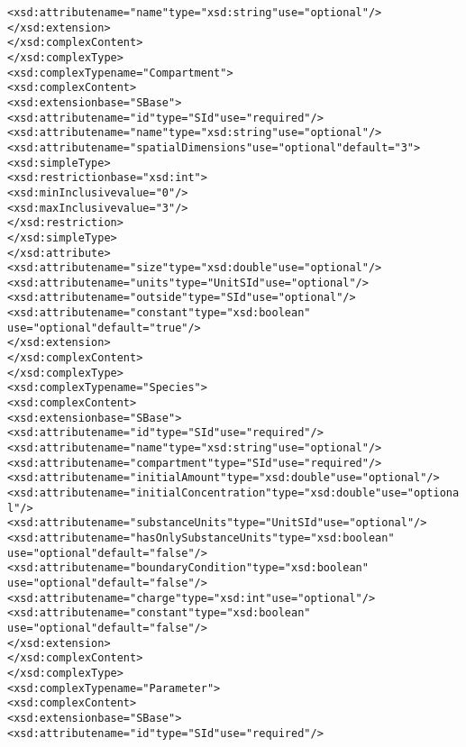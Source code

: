 \begin{alltt}
                <xsd:attribute name="name" type="xsd:string" use="optional"/>
            </xsd:extension>
        </xsd:complexContent>
    </xsd:complexType>
    <xsd:complexType name="Compartment">
        <xsd:complexContent>
            <xsd:extension base="SBase">
                <xsd:attribute name="id" type="SId" use="required"/>
                <xsd:attribute name="name" type="xsd:string" use="optional"/>
                <xsd:attribute name="spatialDimensions" use="optional" default="3">
                    <xsd:simpleType>
                        <xsd:restriction base="xsd:int">
                            <xsd:minInclusive value="0"/>
                            <xsd:maxInclusive value="3"/>
                        </xsd:restriction>
                    </xsd:simpleType>
                </xsd:attribute>
                <xsd:attribute name="size" type="xsd:double" use="optional"/>
                <xsd:attribute name="units" type="UnitSId" use="optional"/>
                <xsd:attribute name="outside" type="SId" use="optional"/>
                <xsd:attribute name="constant" type="xsd:boolean" 
                               use="optional" default="true"/>
            </xsd:extension>
        </xsd:complexContent>
    </xsd:complexType>
    <xsd:complexType name="Species">
        <xsd:complexContent>
            <xsd:extension base="SBase">
                <xsd:attribute name="id" type="SId" use="required"/>
                <xsd:attribute name="name" type="xsd:string" use="optional"/>
                <xsd:attribute name="compartment" type="SId" use="required"/>
                <xsd:attribute name="initialAmount" type="xsd:double" use="optional"/>
                <xsd:attribute name="initialConcentration" type="xsd:double" use="optional"/>
                <xsd:attribute name="substanceUnits" type="UnitSId" use="optional"/>
                <xsd:attribute name="hasOnlySubstanceUnits" type="xsd:boolean" 
                               use="optional" default="false"/>
                <xsd:attribute name="boundaryCondition" type="xsd:boolean" 
                               use="optional" default="false"/>
                <xsd:attribute name="charge" type="xsd:int" use="optional"/>
                <xsd:attribute name="constant" type="xsd:boolean" 
                               use="optional" default="false"/>
            </xsd:extension>
        </xsd:complexContent>
    </xsd:complexType>
    <xsd:complexType name="Parameter">
        <xsd:complexContent>
            <xsd:extension base="SBase">
                <xsd:attribute name="id" type="SId" use="required"/>

\end{alltt}

